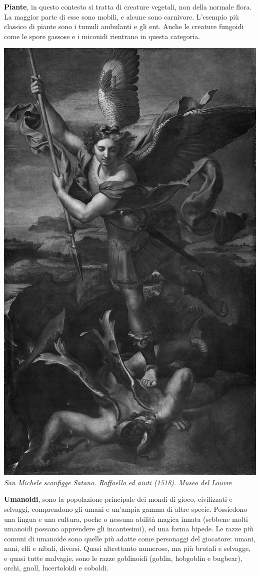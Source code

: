 \begin{multicols}{2}
	\smallskip\textbf{Piante}, in questo contesto si tratta di creature vegetali, non della normale flora. La maggior parte di esse sono mobili, e alcune sono carnivore. L'esempio più classico di piante sono i tumuli ambulanti e gli ent. Anche le creature fungoidi come le spore gassose e i miconidi rientrano in questa categoria.

	\begin{center}
		\includegraphics[width=0.60\linewidth]{immagini/sanmichelesatana.png}\\
		\textit{San Michele sconfigge Satana. Raffaello ed aiuti (1518). Museo del Louvre}
	\end{center}

	\smallskip\textbf{Umanoidi}, sono la popolazione principale dei mondi di gioco, civilizzati e selvaggi, comprendono gli umani e un'ampia gamma di altre specie. Possiedono una lingua e una cultura, poche o nessuna abilità magica innata (sebbene molti umanoidi possano apprendere gli incantesimi), ed una forma bipede. Le razze più comuni di umanoide sono quelle più adatte come personaggi del giocatore: umani, nani, elfi e nibali, diversi. Quasi altrettanto numerose, ma più brutali e selvagge, e quasi tutte malvagie, sono le razze goblinoidi (goblin, hobgoblin e bugbear), orchi, gnoll, lucertoloidi e coboldi.\\


\end{multicols}
